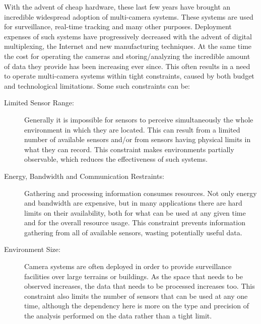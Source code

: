 
With the advent of cheap hardware, these last few years have brought an incredible widespread
adoption of multi-camera systems. These systems are used for surveillance, real-time tracking and
many other purposes. Deployment expenses of such systems have progressively decreased with the
advent of digital multiplexing, the Internet and new manufacturing techniques. At the same time the
cost for operating the cameras and storing/analyzing the incredible amount of data they provide has
been increasing ever since. This often results in a need to operate multi-camera systems within
tight constraints, caused by both budget and technological limitations. Some such constraints can
be:


\begin{description}

\item[Limited Sensor Range:] Generally it is impossible for sensors to perceive simultaneously the
    whole environment in which they are located. This can result from a limited number of available
    sensors and/or from sensors having physical limits in what they can record. This constraint
    makes environments partially observable, which reduces the effectiveness of such systems.

\item[Energy, Bandwidth and Communication Restraints:] Gathering and processing information consumes
    resources. Not only energy and bandwidth are expensive, but in many applications there are hard
    limits on their availability, both for what can be used at any given time and for the overall
    resource usage. This constraint prevents information gathering from all of available sensors,
    wasting potentially useful data.

\item[Environment Size:] Camera systems are often deployed in order to provide surveillance
    facilities over large terrains or buildings. As the space that needs to be observed increases, the
    data that needs to be processed increases too. This constraint also limits the number of sensors
    that can be used at any one time, although the dependency here is more on the type and precision
    of the analysis performed on the data rather than a tight limit.

\end{description}

